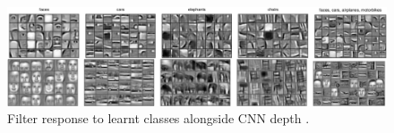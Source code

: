 
\begin{figure}[t]
    \centering
    \scriptsize
    \includegraphics[width=\textwidth]{fig/rel/images/conv_layers.png}
    \caption{Filter response to learnt classes alongside CNN depth \autocite{lee2009convolutional}.}
    \label{fig:cnn_depth}
\end{figure}